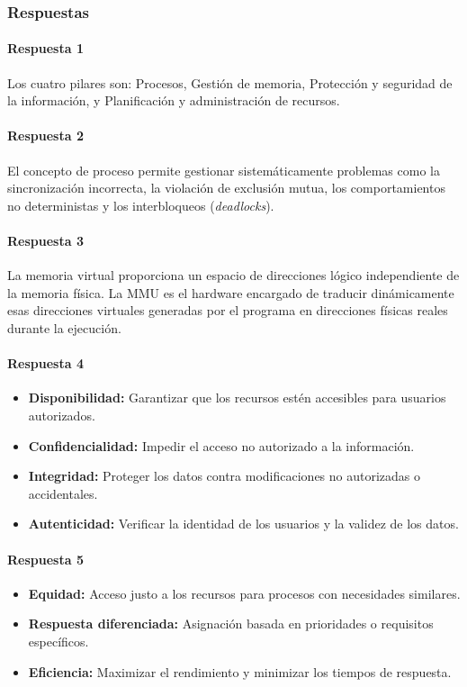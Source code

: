 \subsubsection{Respuestas}

\paragraph{Respuesta 1} Los cuatro pilares son: Procesos, Gestión de memoria, Protección y seguridad de la información, y Planificación y administración de recursos.

\paragraph{Respuesta 2} El concepto de proceso permite gestionar sistemáticamente problemas como la sincronización incorrecta, la violación de exclusión mutua, los comportamientos no deterministas y los interbloqueos (\emph{deadlocks}).

\paragraph{Respuesta 3} La memoria virtual proporciona un espacio de direcciones lógico independiente de la memoria física. La MMU es el hardware encargado de traducir dinámicamente esas direcciones virtuales generadas por el programa en direcciones físicas reales durante la ejecución.

\paragraph{Respuesta 4}
\begin{itemize}
  \item \textbf{Disponibilidad:} Garantizar que los recursos estén accesibles para usuarios autorizados.
  \item \textbf{Confidencialidad:} Impedir el acceso no autorizado a la información.
  \item \textbf{Integridad:} Proteger los datos contra modificaciones no autorizadas o accidentales.
  \item \textbf{Autenticidad:} Verificar la identidad de los usuarios y la validez de los datos.
\end{itemize}

\paragraph{Respuesta 5}
\begin{itemize}
  \item \textbf{Equidad:} Acceso justo a los recursos para procesos con necesidades similares.
  \item \textbf{Respuesta diferenciada:} Asignación basada en prioridades o requisitos específicos.
  \item \textbf{Eficiencia:} Maximizar el rendimiento y minimizar los tiempos de respuesta.
\end{itemize}
